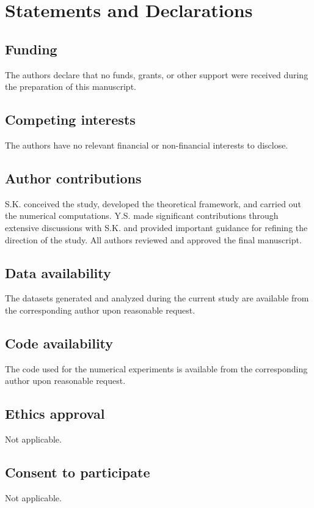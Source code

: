 \documentclass[pdflatex,sn-mathphys-num]{sn-jnl}%
\theoremstyle{thmstyleone}%
\theoremstyle{thmstyletwo}%
\theoremstyle{thmstylethree}%
\begin{document}
\section*{Statements and Declarations}

\subsection*{Funding}
The authors declare that no funds, grants, or other support were received during the preparation of this manuscript.

\subsection*{Competing interests}
The authors have no relevant financial or non-financial interests to disclose.

\subsection*{Author contributions}
S.K. conceived the study, developed the theoretical framework, and carried out the numerical computations. Y.S. made significant contributions through extensive discussions with S.K. and provided important guidance for refining the direction of the study. All authors reviewed and approved the final manuscript.

\subsection*{Data availability}
The datasets generated and analyzed during the current study are available from the corresponding author upon reasonable request.

\subsection*{Code availability}
The code used for the numerical experiments is available from the corresponding author upon reasonable request.

\subsection*{Ethics approval}
Not applicable.

\subsection*{Consent to participate}
Not applicable.
\end{document}

